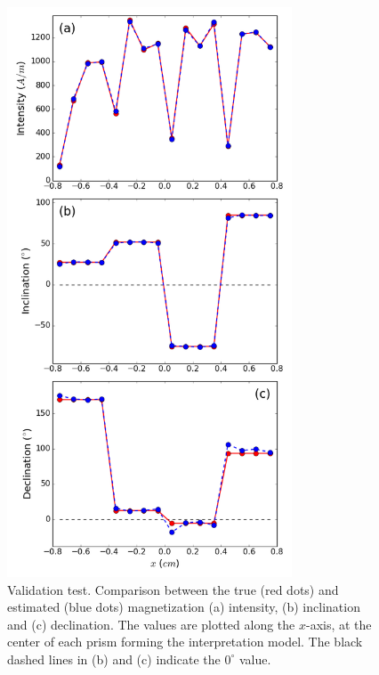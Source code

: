 \documentclass[galley,gc]{agutex}
\begin{document}
 \begin{figure}
 \noindent \includegraphics[width=20pc]{Figs/Fig6_LQ.png}
 \caption{Validation test. Comparison between the true (red dots)
 and estimated (blue dots) magnetization (a) intensity, (b) inclination 
 and (c) declination.
 The values are plotted along the $x$-axis, at the center of each 
 prism forming the interpretation model.
 The black dashed lines in (b) and (c) indicate the $0^{\circ}$ value.}
 \label{fig:estimate-validation}
 \end{figure}
 
\end{document}
